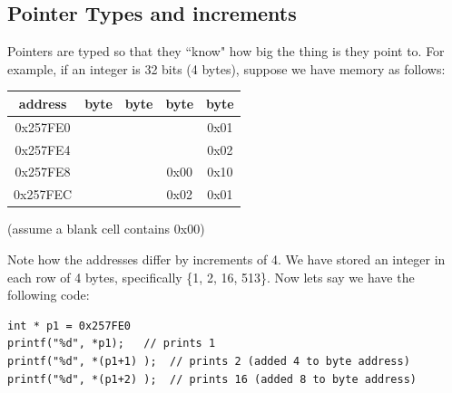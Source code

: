 %

\subsection{Pointer Types and increments}
Pointers are typed so that they ``know" how big the thing is they point to.  
For example, if an integer is 32 bits (4 bytes), suppose we have memory as follows:	%

\begin{tabular}{c|c|c|c|c|}
address & byte & byte & byte & byte \\\hline
0x257FE0  & & & & 0x01\\ \hline
0x257FE4  & & & & 0x02\\ \hline
0x257FE8  & & &0x00 &0x10 \\ \hline
0x257FEC  & & &0x02 &0x01 \\ \hline
\end{tabular}

{(assume a blank cell contains 0x00)}

Note how the addresses differ by increments of 4.	%
We have stored an integer in each row of 4 bytes, specifically \{1, 2, 16, 513\}.  
Now lets say we have the following code:	%

%
\begin{verbatim}
int * p1 = 0x257FE0
printf("%d", *p1);   // prints 1
printf("%d", *(p1+1) );  // prints 2 (added 4 to byte address)
printf("%d", *(p1+2) );  // prints 16 (added 8 to byte address)
\end{verbatim}


